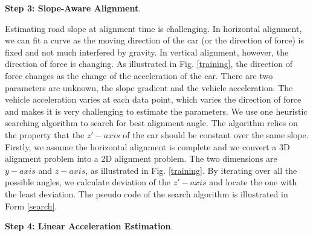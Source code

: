 \textbf{Step 3: Slope-Aware Alignment}. 

Estimating road slope at alignment time is challenging. 
In horizontal alignment, we can fit a curve as the moving
direction of the car (or the direction of force) is fixed and not much interfered 
by gravity. 
In vertical alignment, however, the direction of force is changing. 
As illustrated in Fig. \ref{training}, the direction of force changes
as the change of the acceleration of the car. 
There are two parameters are unknown, the slope gradient 
and the vehicle acceleration. 
The vehicle acceleration varies at each data point, 
which varies the direction of force and makes it is very
challenging to estimate the parameters.
We use one heuristic searching algorithm to search for best alignment angle. 
The algorithm relies on the property that the $z'-axis$ of 
the car should be constant over the same slope. 
Firstly, we assume the horizontal alignment is complete and
we convert a 3D alignment problem into a 2D alignment problem. 
The two dimensions are $y-axis$ and $z-axis$, 
as illustrated in Fig. \ref{training}.
By iterating over all the possible angles, 
we calculate deviation of the $z'-axis$ and locate the one with the least deviation. 
The pseudo code of the search algorithm is illustrated in 
Form \ref{search}.




\textbf{Step 4: Linear Acceleration Estimation}.



